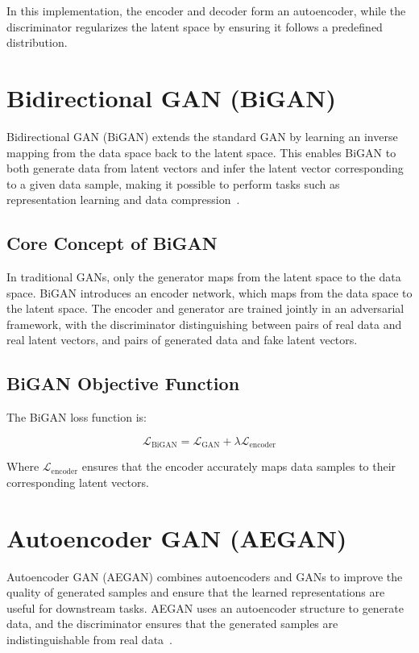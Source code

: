 In this implementation, the encoder and decoder form an autoencoder, while the discriminator regularizes the latent space by ensuring it follows a predefined distribution.

\section{Bidirectional GAN (BiGAN)}
Bidirectional GAN (BiGAN) extends the standard GAN by learning an inverse mapping from the data space back to the latent space. This enables BiGAN to both generate data from latent vectors and infer the latent vector corresponding to a given data sample, making it possible to perform tasks such as representation learning and data compression~\cite{donahue2016adversarial}.

\subsection{Core Concept of BiGAN}
In traditional GANs, only the generator maps from the latent space to the data space. BiGAN introduces an encoder network, which maps from the data space to the latent space. The encoder and generator are trained jointly in an adversarial framework, with the discriminator distinguishing between pairs of real data and real latent vectors, and pairs of generated data and fake latent vectors.

\subsection{BiGAN Objective Function}
The BiGAN loss function is:

\[
\mathcal{L}_{\text{BiGAN}} = \mathcal{L}_{\text{GAN}} + \lambda \mathcal{L}_{\text{encoder}}
\]

Where \( \mathcal{L}_{\text{encoder}} \) ensures that the encoder accurately maps data samples to their corresponding latent vectors.

\section{Autoencoder GAN (AEGAN)}
Autoencoder GAN (AEGAN) combines autoencoders and GANs to improve the quality of generated samples and ensure that the learned representations are useful for downstream tasks. AEGAN uses an autoencoder structure to generate data, and the discriminator ensures that the generated samples are indistinguishable from real data~\cite{donahue2016adversarial}.

